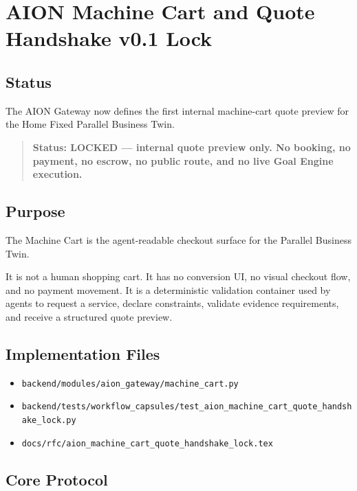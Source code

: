 \section{AION Machine Cart and Quote Handshake v0.1 Lock}
\label{sec:aion-machine-cart-quote-handshake-lock}

\subsection{Status}

The AION Gateway now defines the first internal machine-cart quote preview for the Home Fixed Parallel Business Twin.

\begin{quote}
\textbf{Status: LOCKED --- internal quote preview only. No booking, no payment, no escrow, no public route, and no live Goal Engine execution.}
\end{quote}

\subsection{Purpose}

The Machine Cart is the agent-readable checkout surface for the Parallel Business Twin.

It is not a human shopping cart. It has no conversion UI, no visual checkout flow, and no payment movement. It is a deterministic validation container used by agents to request a service, declare constraints, validate evidence requirements, and receive a structured quote preview.

\subsection{Implementation Files}

\begin{itemize}
  \item \texttt{backend/modules/aion\_gateway/machine\_cart.py}
  \item \texttt{backend/tests/workflow\_capsules/test\_aion\_machine\_cart\_quote\_handshake\_lock.py}
  \item \texttt{docs/rfc/aion\_machine\_cart\_quote\_handshake\_lock.tex}
\end{itemize}

\subsection{Core Protocol}

